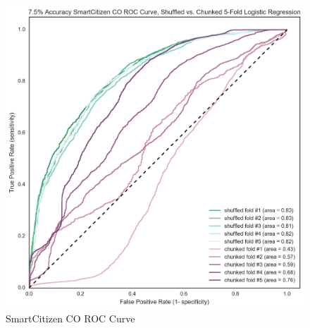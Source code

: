 \begin{figure}[htb]
 	\includegraphics[width=\textwidth]{figs/sck_co_7p5_roc}               
 	 \caption{SmartCitizen CO ROC Curve}
  	\label{fig:sck_co_7p5_roc}
\end{figure}

